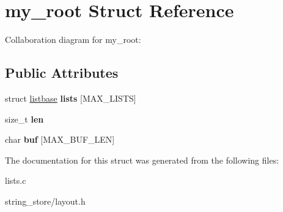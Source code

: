 \hypertarget{structmy__root}{}\section{my\+\_\+root Struct Reference}
\label{structmy__root}


Collaboration diagram for my\+\_\+root\+:
\subsection*{Public Attributes}
\begin{DoxyCompactItemize}
\item 
\mbox{\label{structmy__root_a33af2f3f4bf71c2eac3426a69ddd3cba}} 
struct \hyperlink{structlistbase}{listbase} {\bfseries lists} \mbox{[}M\+A\+X\+\_\+\+L\+I\+S\+TS\mbox{]}
\item 
\mbox{\label{structmy__root_ae92d2ec9e65d302573f7c8cb93e1a40f}} 
size\+\_\+t {\bfseries len}
\item 
\mbox{\label{structmy__root_ac4da2ec0d59575f4ef79419ec73b3b19}} 
char {\bfseries buf} \mbox{[}M\+A\+X\+\_\+\+B\+U\+F\+\_\+\+L\+EN\mbox{]}
\end{DoxyCompactItemize}


The documentation for this struct was generated from the following files\+:\begin{DoxyCompactItemize}
\item 
lists.\+c\item 
string\+\_\+store/layout.\+h\end{DoxyCompactItemize}

